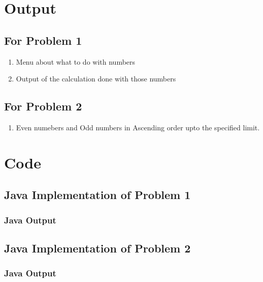 \documentclass[11pt]{article}
\begin{document}
\section{Output}
\subsection*{For Problem 1}
\begin{enumerate}
	\item Menu about what to do with numbers
	\item Output of the calculation done with those numbers
\end{enumerate}
\subsection*{For Problem 2}
\begin{enumerate}
	\item Even numebers and Odd numbers in Ascending order upto the specified limit.
\end{enumerate}


\section{Code}

\subsection{Java Implementation of Problem 1}



\subsubsection{Java Output}


\subsection{Java Implementation of Problem 2}



\subsubsection{Java Output}

\end{document}
